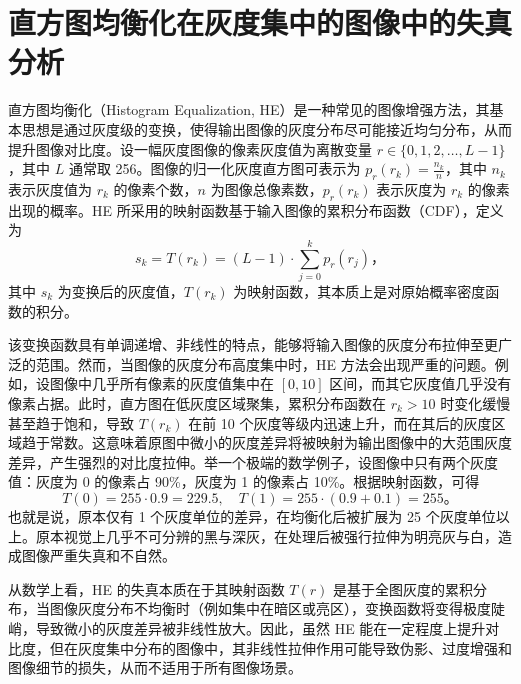\documentclass{ctexart}
\begin{document}
\section*{直方图均衡化在灰度集中的图像中的失真分析}

直方图均衡化（Histogram Equalization, HE）是一种常见的图像增强方法，其基本思想是通过灰度级的变换，使得输出图像的灰度分布尽可能接近均匀分布，从而提升图像对比度。设一幅灰度图像的像素灰度值为离散变量 $r \in \{0, 1, 2, \dots, L-1\}$，其中 $L$ 通常取 256。图像的归一化灰度直方图可表示为 $p_r(r_k) = \frac{n_k}{n}$，其中 $n_k$ 表示灰度值为 $r_k$ 的像素个数，$n$ 为图像总像素数，$p_r(r_k)$ 表示灰度为 $r_k$ 的像素出现的概率。HE 所采用的映射函数基于输入图像的累积分布函数（CDF），定义为
\[
s_k = T(r_k) = (L - 1) \cdot \sum_{j=0}^{k} p_r(r_j)，
\]
其中 $s_k$ 为变换后的灰度值，$T(r_k)$ 为映射函数，其本质上是对原始概率密度函数的积分。

该变换函数具有单调递增、非线性的特点，能够将输入图像的灰度分布拉伸至更广泛的范围。然而，当图像的灰度分布高度集中时，HE 方法会出现严重的问题。例如，设图像中几乎所有像素的灰度值集中在 $[0,10]$ 区间，而其它灰度值几乎没有像素占据。此时，直方图在低灰度区域聚集，累积分布函数在 $r_k > 10$ 时变化缓慢甚至趋于饱和，导致 $T(r_k)$ 在前 10 个灰度等级内迅速上升，而在其后的灰度区域趋于常数。这意味着原图中微小的灰度差异将被映射为输出图像中的大范围灰度差异，产生强烈的对比度拉伸。举一个极端的数学例子，设图像中只有两个灰度值：灰度为 0 的像素占 90\%，灰度为 1 的像素占 10\%。根据映射函数，可得
\[
T(0) = 255 \cdot 0.9 = 229.5, \quad T(1) = 255 \cdot (0.9 + 0.1) = 255。
\]
也就是说，原本仅有 1 个灰度单位的差异，在均衡化后被扩展为 25 个灰度单位以上。原本视觉上几乎不可分辨的黑与深灰，在处理后被强行拉伸为明亮灰与白，造成图像严重失真和不自然。

从数学上看，HE 的失真本质在于其映射函数 $T(r)$ 是基于全图灰度的累积分布，当图像灰度分布不均衡时（例如集中在暗区或亮区），变换函数将变得极度陡峭，导致微小的灰度差异被非线性放大。因此，虽然 HE 能在一定程度上提升对比度，但在灰度集中分布的图像中，其非线性拉伸作用可能导致伪影、过度增强和图像细节的损失，从而不适用于所有图像场景。
   \newpage
\end{document}
